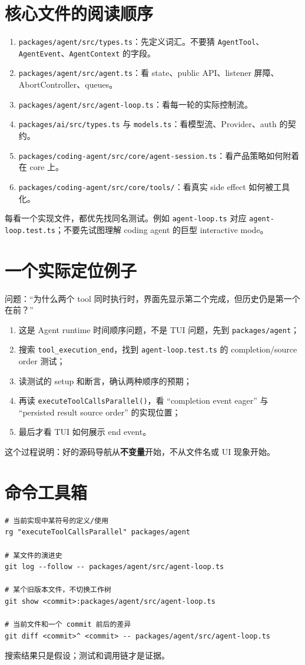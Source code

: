 \documentclass[UTF8,openany,11pt]{ctexbook}
\newcommand{\pathref}[1]{\texttt{#1}}
\newcommand{\term}[1]{\textbf{#1}}
\begin{document}
\section{核心文件的阅读顺序}
\begin{enumerate}
\item \pathref{packages/agent/src/types.ts}：先定义词汇。不要猜 \texttt{AgentTool}、\texttt{AgentEvent}、\texttt{AgentContext} 的字段。
\item \pathref{packages/agent/src/agent.ts}：看 state、public API、listener 屏障、AbortController、queues。
\item \pathref{packages/agent/src/agent-loop.ts}：看每一轮的实际控制流。
\item \pathref{packages/ai/src/types.ts} 与 \pathref{models.ts}：看模型流、Provider、auth 的契约。
\item \pathref{packages/coding-agent/src/core/agent-session.ts}：看产品策略如何附着在 core 上。
\item \pathref{packages/coding-agent/src/core/tools/}：看真实 side effect 如何被工具化。
\end{enumerate}

每看一个实现文件，都优先找同名测试。例如 \texttt{agent-loop.ts} 对应 \texttt{agent-loop.test.ts}；不要先试图理解 coding agent 的巨型 interactive mode。

\section{一个实际定位例子}
问题：``为什么两个 tool 同时执行时，界面先显示第二个完成，但历史仍是第一个在前？''
\begin{enumerate}
\item 这是 Agent runtime 时间顺序问题，不是 TUI 问题，先到 \texttt{packages/agent}；
\item 搜索 \texttt{tool\_execution\_end}，找到 \texttt{agent-loop.test.ts} 的 completion/source order 测试；
\item 读测试的 setup 和断言，确认两种顺序的预期；
\item 再读 \texttt{executeToolCallsParallel()}，看 ``completion event eager'' 与 ``persisted result source order'' 的实现位置；
\item 最后才看 TUI 如何展示 end event。
\end{enumerate}
这个过程说明：好的源码导航从\term{不变量}开始，不从文件名或 UI 现象开始。

\section{命令工具箱}
\begin{Verbatim}[fontsize=\small]
# 当前实现中某符号的定义/使用
rg "executeToolCallsParallel" packages/agent

# 某文件的演进史
git log --follow -- packages/agent/src/agent-loop.ts

# 某个旧版本文件，不切换工作树
git show <commit>:packages/agent/src/agent-loop.ts

# 当前文件和一个 commit 前后的差异
git diff <commit>^ <commit> -- packages/agent/src/agent-loop.ts
\end{Verbatim}
搜索结果只是假设；测试和调用链才是证据。
\end{document}
